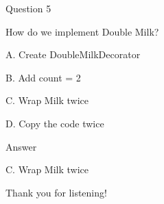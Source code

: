\documentclass[aspectratio=169]{beamer}
\begin{document}

\begin{frame}{Question 5}

How do we implement Double Milk?

\bigskip

A. Create DoubleMilkDecorator

B. Add count = 2

C. Wrap Milk twice

D. Copy the code twice

\pause

\begin{alertblock}{Answer}

C. Wrap Milk twice

\end{alertblock}

\end{frame}


\begin{frame}

\centering

\Huge

Thank you for listening!

\end{frame}

\end{document}
